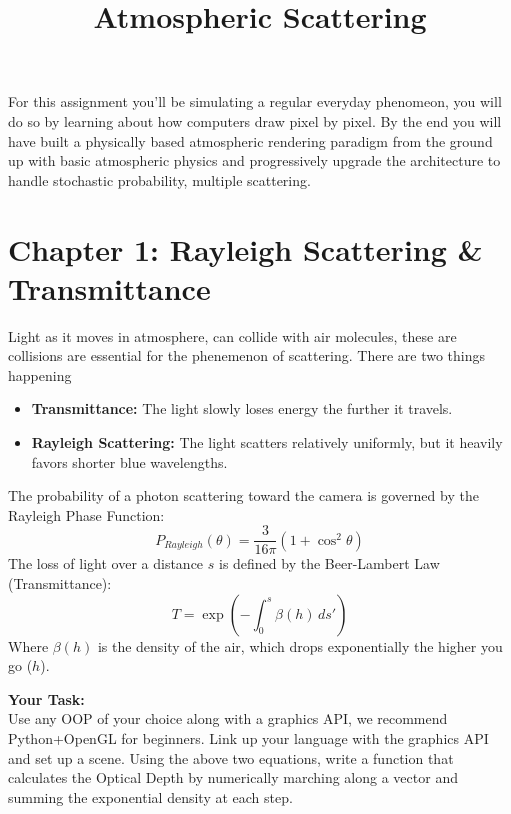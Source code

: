\documentclass[12pt]{article}
\title{\textbf{Atmospheric Scattering}}
\author{}
\date{}
\begin{document}
\maketitle

\begin{mdframed}[backgroundcolor=gray!10, linecolor=gray!50, roundcorner=5pt, innertopmargin=10pt, innerbottommargin=10pt, innerleftmargin=10pt, innerrightmargin=10pt]
For this assignment you'll be simulating a regular everyday phenomeon, you will do so by learning about how computers draw pixel by pixel.
By the end you will have built a physically based atmospheric rendering paradigm from the ground up with basic atmospheric physics and progressively upgrade the architecture to handle stochastic probability, multiple scattering.
\end{mdframed}
\vspace{0.5cm}

\section*{Chapter 1: Rayleigh Scattering \& Transmittance}
Light as it moves in atmosphere, can collide with air molecules, these are collisions are essential for the phenemenon of scattering. There are two things happening
\begin{itemize}
    \item \textbf{Transmittance:} The light slowly loses energy the further it travels.
    \item \textbf{Rayleigh Scattering:} The light scatters relatively uniformly, but it heavily favors shorter blue wavelengths.
\end{itemize}

The probability of a photon scattering toward the camera is governed by the Rayleigh Phase Function:
\begin{equation}
    P_{Rayleigh}(\theta) = \frac{3}{16\pi} (1 + \cos^2\theta)
\end{equation}
The loss of light over a distance $s$ is defined by the Beer-Lambert Law (Transmittance):
\begin{equation}
    T = \exp\left(-\int_{0}^{s} \beta(h) \, ds'\right)
\end{equation}
Where $\beta(h)$ is the density of the air, which drops exponentially the higher you go ($h$).

\vspace{0.2cm}\noindent\textbf{Your Task:}\\
Use any OOP of your choice along with a graphics API, we recommend Python+OpenGL for beginners. Link up your language with the graphics API and set up a scene. Using the above two equations, write a function that calculates the Optical Depth by numerically marching along a vector and summing the exponential density at each step.
\end{document}
